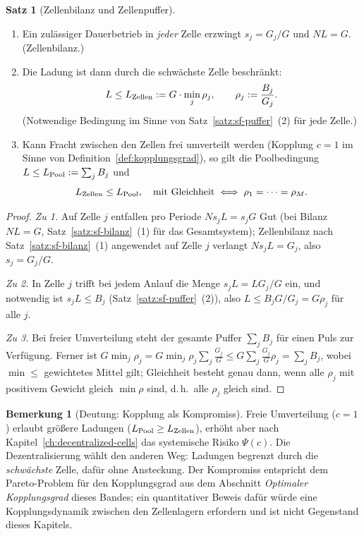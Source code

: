 \documentclass[a4paper, 12pt, twoside, openright]{report}
\theoremstyle{definition}
\theoremstyle{definition}
\newtheorem{satz}{Satz}[chapter]
\newtheorem{bemerkung}{Bemerkung}[chapter]
\begin{document}
\begin{satz}[Zellenbilanz und Zellenpuffer]\label{satz:sf-zellen}
\begin{enumerate}
  \item Ein zulässiger Dauerbetrieb in \emph{jeder} Zelle erzwingt
    $s_j=G_j/G$ und $N L=G$. (Zellenbilanz.)
  \item Die Ladung ist dann durch die schwächste Zelle beschränkt:
    \begin{equation}
      L\le L_{\rm Zellen}:=G\cdot\min_j\rho_j,\qquad\rho_j:=\frac{B_j}{G_j}.
      \label{eq:sf-zell}
    \end{equation}
    (Notwendige Bedingung im Sinne von Satz~\ref{satz:sf-puffer}~(2) für jede Zelle.)
  \item Kann Fracht zwischen den Zellen frei umverteilt werden (Kopplung $c=1$ im
    Sinne von Definition~\ref{def:kopplungsgrad}), so gilt die Poolbedingung
    $L\le L_{\rm Pool}:=\sum_jB_j$ und
    \begin{equation}
      L_{\rm Zellen}\le L_{\rm Pool},\quad\text{mit Gleichheit}\iff\rho_1=\dots=\rho_M .
      \label{eq:sf-pool}
    \end{equation}
\end{enumerate}
\end{satz}

\begin{proof}
\emph{Zu 1.} Auf Zelle $j$ entfallen pro Periode $N s_jL=s_jG$ Gut (bei Bilanz $NL=G$,
Satz~\ref{satz:sf-bilanz}~(1) für das Gesamtsystem); Zellenbilanz nach
Satz~\ref{satz:sf-bilanz}~(1) angewendet auf Zelle $j$ verlangt $Ns_jL=G_j$, also
$s_j=G_j/G$.

\emph{Zu 2.} In Zelle $j$ trifft bei jedem Anlauf die Menge $s_jL=LG_j/G$ ein, und
notwendig ist $s_jL\le B_j$ (Satz~\ref{satz:sf-puffer}~(2)), also
$L\le B_jG/G_j=G\rho_j$ für alle $j$.

\emph{Zu 3.} Bei freier Umverteilung steht der gesamte Puffer $\sum_jB_j$ für einen
Puls zur Verfügung. Ferner ist
$G\min_j\rho_j=G\min_j\rho_j\sum_j\frac{G_j}{G}\le G\sum_j\frac{G_j}{G}\rho_j=\sum_jB_j$,
wobei $\min\le$ gewichtetes Mittel gilt; Gleichheit besteht genau dann, wenn alle
$\rho_j$ mit positivem Gewicht gleich $\min\rho$ sind, d.\,h.\ alle $\rho_j$ gleich
sind.
\end{proof}

\begin{bemerkung}[Deutung: Kopplung als Kompromiss]
Freie Umverteilung ($c=1$) erlaubt größere Ladungen ($L_{\rm Pool}\ge L_{\rm Zellen}$),
erhöht aber nach Kapitel~\ref{ch:decentralized-cells} das systemische Risiko $\Psi(c)$.
Die Dezentralisierung wählt den anderen Weg: Ladungen begrenzt durch die
\emph{schwächste} Zelle, dafür ohne Ansteckung. Der Kompromiss entspricht dem
Pareto-Problem für den Kopplungsgrad aus dem Abschnitt \emph{Optimaler Kopplungsgrad}
dieses Bandes; ein quantitativer Beweis dafür würde eine Kopplungsdynamik
zwischen den Zellenlagern erfordern und ist nicht Gegenstand dieses Kapitels.
\end{bemerkung}
\end{document}
